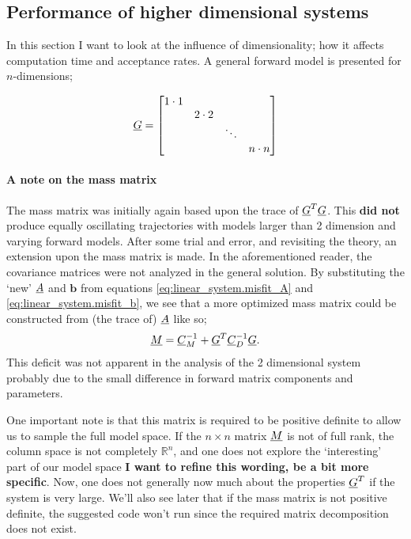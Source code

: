 \subsection{Performance of higher dimensional systems}

In this section I want to look at the influence of dimensionality; how it affects computation time and acceptance rates. A general forward model is presented for $n$-dimensions;

\begin{gather}
	\underline{G} =
	\begin{bmatrix}
		1\cdot 1 &   &        & \\
		  & 2\cdot 2 &        & \\
		  &   & \ddots & \\
		  &   &        & n \cdot n
	\end{bmatrix}
\end{gather}
\paragraph{A note on the mass matrix}The mass matrix was initially again based upon the trace of $\underline{G}^T\underline{G}$. This \textbf{did not} produce equally oscillating trajectories with models larger than 2 dimension and varying forward models. After some trial and error, and revisiting the theory, an extension upon the mass matrix is made. In the aforementioned reader, the covariance matrices were not analyzed in the general solution. By substituting the `new' $\underline{A}$ and $\mathbf{b}$ from equations \eqref{eq:linear_system.misfit_A} and \eqref{eq:linear_system.misfit_b}, we see that a more optimized mass matrix could be constructed from (the trace of) $\underline{A}$ like so;
\begin{align}\label{eq:extendedMassMatrix}
	\underline{M} = \underline{C}_M^{-1} + \underline{G}^T \underline{C}_D^{-1}\underline{G}.
\end{align}
This deficit was not apparent in the analysis of the 2 dimensional system probably due to the small difference in forward matrix components and parameters.

One important note is that this matrix is required to be positive definite to allow us to sample the full model space. If the $n\times n$ matrix $\underline{M}$ is not of full rank, the column space is not completely $\mathbb{R}^n$, and one does not explore the `interesting' part of our model space \textbf{I want to refine this wording, be a bit more specific}. Now, one does not generally now much about the properties $\underline{G}^T$ if the system is very large. We'll also see later that if the mass matrix is not positive definite, the suggested code won't run since the required matrix decomposition does not exist. 

